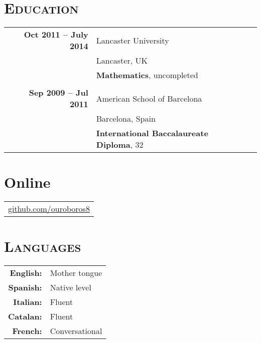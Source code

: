 \documentclass[a4paper,10pt]{article} %
\newcommand*{\justifyheading}{\raggedright}
\begin{document}
\section{\textsc{Education}}
\begin{tabularx}{\textwidth}{XrlXr}
  &  \textbf{Oct 2011 -- July 2014} & Lancaster University & &\\
  &                                 & Lancaster, UK & & \\
  &                                 & \textbf{Mathematics}, uncompleted & &\\
\multicolumn{5}{c}{}\\ %
  &  \textbf{Sep 2009 -- Jul 2011}  & American School of Barcelona & &\\
  &                                 & Barcelona, Spain & &\\
  &                                 & \textbf{International Baccalaureate Diploma}, 32 & &\\
\end{tabularx}


\medskip

\begin{minipage}[t]{0.75\textwidth}
\section{Online}
\smallskip
\begin{tabular}{l}
\href{https://github.com/ouroboros8}{github.com/ouroboros8}
\end{tabular}
\end{minipage}\hspace{-0.01\textwidth}
%
%
\begin{minipage}[t]{0.25\textwidth}
\renewcommand{\justifyheading}{\raggedleft}
\section{\textsc{Languages}}
\smallskip
\begin{tabular}{rl}
 \textbf{English:} & Mother tongue  \\

 \textbf{Spanish:} & Native level  \\

 \textbf{Italian:} & Fluent  \\

 \textbf{Catalan:} & Fluent  \\

 \textbf{French:}  & Conversational
\end{tabular}
\end{minipage}
\end{document}
